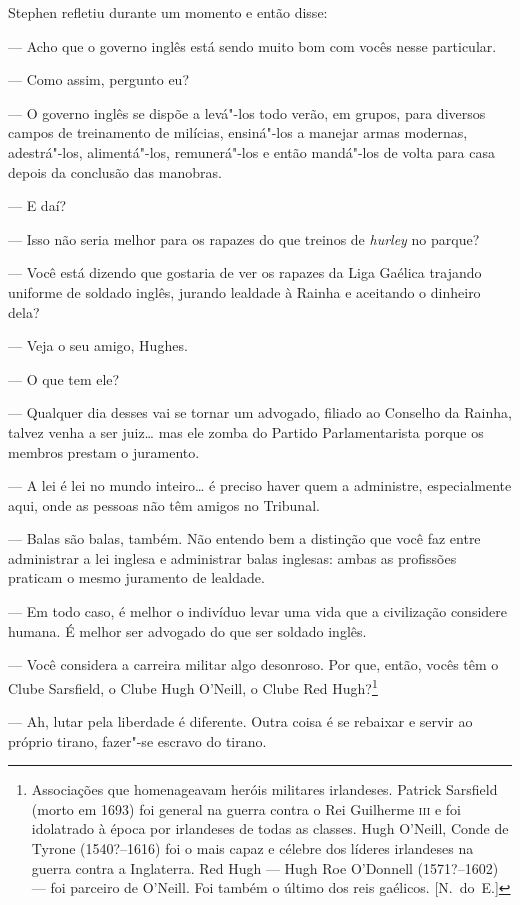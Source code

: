 Stephen refletiu durante um momento e então disse:

--- Acho que o governo inglês está sendo muito bom com vocês
nesse particular.

--- Como assim, pergunto eu?

--- O governo inglês se dispõe a levá"-los todo verão, em grupos,
para diversos campos de treinamento de milícias, ensiná"-los a manejar
armas modernas, adestrá"-los, alimentá"-los, remunerá"-los e então
mandá"-los de volta para casa depois da conclusão das manobras.

--- E daí?

--- Isso não seria melhor para os rapazes do que treinos de
\textit{hurley} no parque?

--- Você está dizendo que gostaria de ver os rapazes da Liga
Gaélica trajando uniforme de soldado inglês, jurando lealdade à Rainha
e aceitando o dinheiro dela?

--- Veja o seu amigo, Hughes.

--- O que tem ele?

--- Qualquer dia desses vai se tornar um advogado, filiado ao
Conselho da Rainha, talvez venha a ser juiz\ldots{} mas ele zomba do Partido
Parlamentarista porque os membros prestam o juramento.

--- A lei é lei no mundo inteiro\ldots{} é preciso haver quem a
administre, especialmente aqui, onde as pessoas não têm amigos no
Tribunal.

--- Balas são balas, também.  Não entendo bem a distinção que
você faz entre administrar a lei inglesa e administrar balas inglesas:
ambas as profissões praticam o mesmo juramento de lealdade.

--- Em todo caso, é melhor o indivíduo levar uma vida que a
civilização considere humana.  É melhor ser advogado do que ser soldado
inglês.

--- Você considera a carreira militar algo desonroso.  Por que,
então, vocês têm o Clube Sarsfield, o Clube Hugh O’Neill, o Clube Red
Hugh?\footnote{ Associações que homenageavam heróis militares
irlandeses.  Patrick Sarsfield (morto em 1693) foi general na guerra
contra o Rei Guilherme \textsc{iii} e foi idolatrado à época por irlandeses de
todas as classes.  Hugh O’Neill, Conde de Tyrone (1540?--1616) foi o
mais capaz e célebre dos líderes irlandeses na guerra contra a
Inglaterra.  Red Hugh --- Hugh Roe O’Donnell (1571?--1602) --- foi parceiro
de O’Neill.  Foi também o último dos reis gaélicos. [N.~do~E.]}

--- Ah, lutar pela liberdade é diferente.  Outra coisa é se
rebaixar e servir ao próprio tirano, fazer"-se escravo do tirano.

